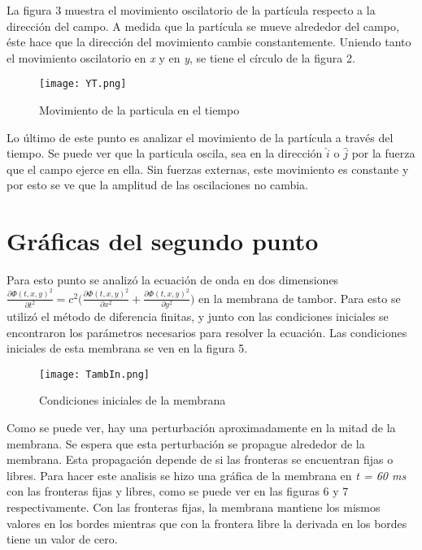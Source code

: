 \documentclass[11pt,letterpaper]{exam}
\begin{document}
La figura 3 muestra el movimiento oscilatorio de la partícula respecto a la dirección del campo. A medida que la partícula se mueve alrededor del campo, éste hace que la dirección del movimiento cambie constantemente. Uniendo tanto el movimiento oscilatorio en \textit{x} y en \textit{y}, se tiene el círculo de la figura 2.\\

\begin{figure}[H]
	\centering
	\texttt{[image: YT.png]}
	\caption{Movimiento de la particula en el tiempo}
\end{figure}

Lo último de este punto es analizar el movimiento de la partícula a través del tiempo. Se puede ver que la particula oscila, sea en la dirección $\hat{i}$ o $\hat{j}$ por la fuerza que el campo ejerce en ella. Sin fuerzas externas, este movimiento es constante y por esto se ve que la amplitud de las oscilaciones no cambia.

\section{Gráficas del segundo punto}
Para esto punto se analizó la ecuación de onda en dos dimensiones $\frac{\partial \Phi(t,x,y)^2}{\partial t^2} = c^2\Big(\frac{\partial \Phi(t,x,y)^2}{\partial x^2} + \frac{\partial \Phi(t,x,y)^2}{\partial y^2}\Big)$ en la membrana de tambor. Para esto se utilizó el método de diferencia finitas, y junto con las condiciones iniciales se encontraron los parámetros necesarios para resolver la ecuación. Las condiciones iniciales de esta membrana se ven en la figura 5.\\
\begin{figure}[H]
	\centering
	\texttt{[image: TambIn.png]}
	\caption{Condiciones iniciales de la membrana}
\end{figure}

Como se puede ver, hay una perturbación aproximadamente en la mitad de la membrana. Se espera que esta perturbación se propague alrededor de la membrana. Esta propagación depende de si las fronteras se encuentran fijas o libres. Para hacer este analisis se hizo una gráfica de la membrana en \textit{t = 60 ms} con las fronteras fijas y libres, como se puede ver en las figuras 6 y 7 respectivamente. Con las fronteras fijas, la membrana mantiene los mismos valores en los bordes mientras que con la frontera libre la derivada en los bordes tiene un valor de cero.\\
\end{document}
